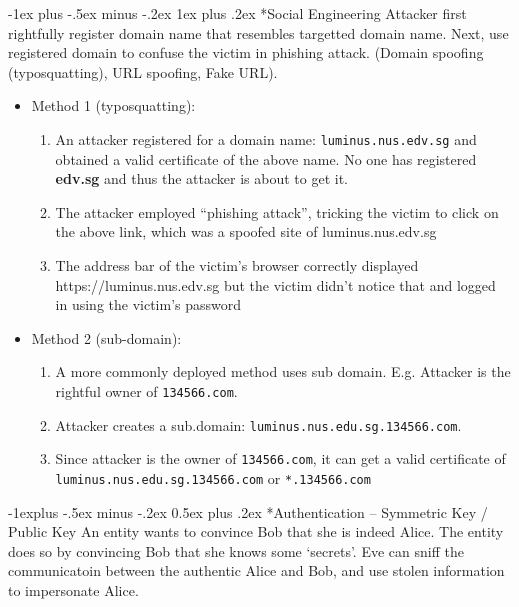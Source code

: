 \documentclass[10pt,landscape]{article}
\makeatletter
\renewcommand{\subsection}{\@startsection{subsection}{2}{0mm}%
                                {-1explus -.5ex minus -.2ex}%
                                {0.5ex plus .2ex}%
                                {\normalfont\normalsize\bfseries}}
\renewcommand{\subsubsection}{\@startsection{subsubsection}{3}{0mm}%
                                {-1ex plus -.5ex minus -.2ex}%
                                {1ex plus .2ex}%
                                {\normalfont\small\bfseries}}
\makeatother
\begin{document}
\begin{multicols*}{3}
\subsubsection*{Social Engineering}
Attacker first rightfully register domain name that resembles targetted domain name. Next, use registered domain
to confuse the victim in phishing attack. (Domain spoofing (typosquatting), URL spoofing, Fake URL).
\begin{itemize}[noitemsep,wide=0pt, leftmargin=\dimexpr{} + 2\relax]
    \item Method 1 (typosquatting):
    \begin{enumerate}[noitemsep,wide=0pt, leftmargin=\dimexpr\labelwidth + 2\labelsep\relax]
        \item An attacker registered for a domain name: \verb|luminus.nus.edv.sg|
        and obtained a valid certificate of the above name. No one has registered \textbf{edv.sg} and thus the attacker is about to get it.
        \item The attacker employed “phishing attack”, tricking the victim to click on the above link, which was a spoofed site of
        luminus.nus.edv.sg
        \item The address bar of the victim’s browser correctly displayed
        https://luminus.nus.edv.sg
        but the victim didn’t notice that and logged in using the victim’s password
    \end{enumerate}
    \item Method 2 (sub-domain):
    \begin{enumerate}[noitemsep,wide=0pt, leftmargin=\dimexpr\labelwidth + 2\labelsep\relax]
        \item A more commonly deployed method uses sub domain. E.g. Attacker is the rightful owner of \verb|134566.com|. 
        \item Attacker creates a sub.domain: \verb|luminus.nus.edu.sg.134566.com|.
        \item Since attacker is the owner of \verb|134566.com|, it can get a valid certificate of \verb|luminus.nus.edu.sg.134566.com| or \verb|*.134566.com|
    \end{enumerate}
\end{itemize}

\subsection*{Authentication -- Symmetric Key / Public Key}
An entity wants to convince Bob that she is indeed Alice. The entity does so by convincing Bob that she knows some `secrets'.
Eve can sniff the communicatoin between the authentic Alice and Bob, and use stolen information to impersonate Alice.


\end{multicols*}
\end{document}
